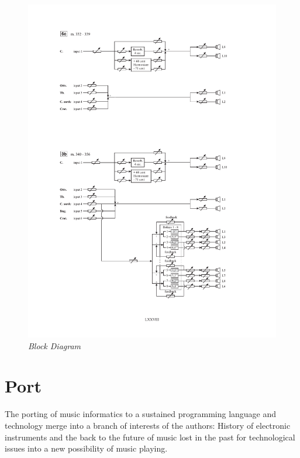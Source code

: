 \documentclass[twoside,a4paper]{article}
\begin{document}
\begin{figure}[ht]
\centerline{\includegraphics[scale=0.5]{img/re-diagramma3b}}
\caption{\label{re-dia-3b}{\it Block Diagram}}
\end{figure}


\section{Port}
\label{sec:porting}

The porting of music informatics to a sustained programming language and technology merge into a branch of interests of the authors: History of electronic instruments and the back to the future of music lost in the past for technological issues into a new possibility of music playing. 
\end{document}
